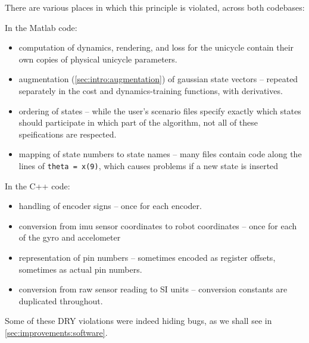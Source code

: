 \documentclass[main.tex]{subfiles}
\begin{document}
	There are various places in which this principle is violated, across both codebases:
	\begin{multicols}{2}
		\raggedcolumns
		\noindent
		In the Matlab code:

		\begin{itemize}[noitemsep]
			\item computation of dynamics, rendering, and loss for the unicycle contain their own copies of physical unicycle parameters.
			\item augmentation (\ref{sec:intro:augmentation}) of gaussian state vectors -- repeated separately in the cost and dynamics-training functions, with derivatives.
			\item ordering of states -- while the user's scenario files specify exactly which states should participate in which part of the algorithm, not all of these speifications are respected.
			\item mapping of state numbers to state names -- many files contain code along the lines of \lstinline{theta = x(9)}, which causes problems if a new state is inserted
		\end{itemize}

		\columnbreak

		\noindent
		In the C++ code:

		\begin{itemize}[noitemsep]
			\item handling of encoder signs -- once for each encoder.
			\item conversion from imu sensor coordinates to robot coordinates -- once for each of the gyro and accelometer
			\item representation of pin numbers -- sometimes encoded as register offsets, sometimes as actual pin numbers.
			\item conversion from raw sensor reading to SI units -- conversion constants are duplicated throughout.
		\end{itemize}
	\end{multicols}
	Some of these DRY violations were indeed hiding bugs, as we shall see in \cref{sec:improvements:software}.
\end{document}
